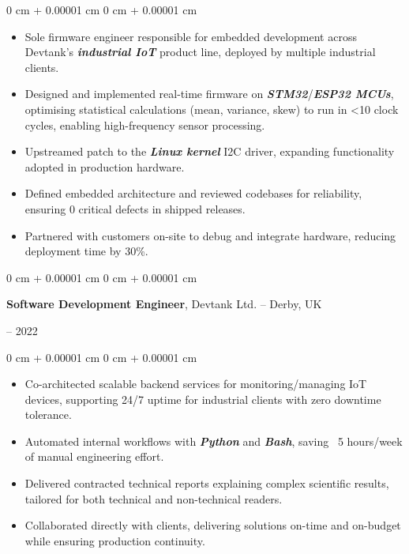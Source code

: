 \documentclass[10pt, letterpaper]{article}
\newenvironment{highlights}{
    \begin{itemize}[
        topsep=0.2 cm,
        parsep=0.2 cm,
        partopsep=0pt,
        itemsep=0.025 cm,
        leftmargin=0 cm + 10pt
    ]
}{
    \end{itemize}
}
\newenvironment{onecolentry}{
    \begin{adjustwidth}{
        0 cm + 0.00001 cm
    }{
        0 cm + 0.00001 cm
    }
}{
    \end{adjustwidth}
}
\newenvironment{twocolentry}[2][]{
    \onecolentry
    \def\secondColumn{#2}
    \setcolumnwidth{\fill, 4.75 cm}
    \begin{paracol}{2}
}{
    \switchcolumn \raggedleft \secondColumn
    \end{paracol}
    \endonecolentry
}
\begin{document}
        \vspace{0.10 cm}
        \begin{onecolentry}
            \begin{highlights}
            \item Sole firmware engineer responsible for embedded development across Devtank’s \textbf{\textit{industrial IoT}} product line, deployed by multiple industrial clients.
            \item Designed and implemented real-time firmware on \textbf{\textit{STM32}}/\textbf{\textit{ESP32 MCUs}}, optimising statistical calculations (mean, variance, skew) to run in <10 clock cycles, enabling high-frequency sensor processing.
            \item Upstreamed patch to the \textbf{\textit{Linux kernel}} I2C driver, expanding functionality adopted in production hardware.
                \item Defined embedded architecture and reviewed codebases for reliability, ensuring 0 critical defects in shipped releases.
                \item Partnered with customers on-site to debug and integrate hardware, reducing deployment time by 30\%.
            \end{highlights}
        \end{onecolentry}


        \vspace{0.2 cm}

        \begin{twocolentry}{
            2020 – 2022
        }
            \textbf{Software Development Engineer}, Devtank Ltd. -- Derby, UK
        \end{twocolentry}

        \vspace{0.10 cm}
        \begin{onecolentry}
            \begin{highlights}
                \item Co-architected scalable backend services for monitoring/managing IoT devices, supporting 24/7 uptime for industrial clients with zero downtime tolerance.
                \item Automated internal workflows with \textbf{\textit{Python}} and \textbf{\textit{Bash}}, saving ~5 hours/week of manual engineering effort.
                \item Delivered contracted technical reports explaining complex scientific results, tailored for both technical and non-technical readers.
                \item Collaborated directly with clients, delivering solutions on-time and on-budget while ensuring production continuity.
            \end{highlights}
        \end{onecolentry}
\end{document}
